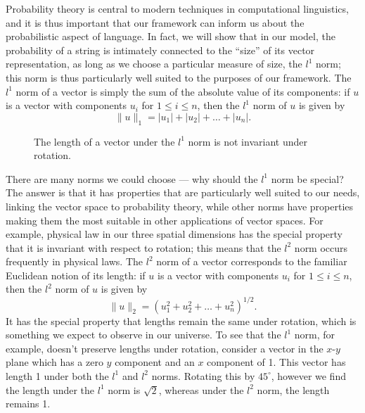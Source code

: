 Probability theory is central to modern techniques in computational linguistics, and it is thus important that our framework can inform us about the probabilistic aspect of language. In fact, we will show that in our model, the probability of a string is intimately connected to the ``size'' of its vector representation, as long as we choose a particular measure of size, the $l^1$ norm; this norm is thus particularly well suited to the purposes of our framework.
The $l^1$ norm of a vector is simply the sum of the absolute value of its components:  if $u$ is a vector with components $u_i$ for $1 \le i \le n$, then the $l^1$ norm of $u$ is given by
$$\|u\|_1 = |u_1| + |u_2| +\ldots + |u_n|.$$

\begin{figure}
\begin{center}
\subfigure{}
\subfigure{}
\caption{The length of a vector under the $l^1$ norm is not invariant under rotation.}
\end{center}
\end{figure}

 There are many norms we could choose --- why should the $l^1$ norm be special? The answer is that it has properties that are particularly well suited to our needs, linking the vector space to probability theory, while other norms have properties making them the most suitable in other applications of vector spaces.
For example, physical law in our three spatial dimensions has the special property that it is invariant with respect to rotation; this means that the $l^2$ norm occurs frequently in physical laws. The $l^2$ norm of a vector corresponds to the familiar Euclidean notion of its length: if $u$ is a vector with components $u_i$ for $1 \le i \le n$, then the $l^2$ norm of $u$ is given by
$$\|u\|_2 = (u_1^2 + u_2^2 +\ldots + u_n^2)^{1/2}.$$
It has the special property that lengths remain the same under rotation, which is something we expect to observe in our universe. 
To see that the $l^1$ norm, for example, doesn't preserve lengths under rotation, consider a vector in the $x$-$y$ plane which has a zero $y$ component and an $x$ component of 1. This vector has length 1 under both the $l^1$ and $l^2$ norms. Rotating this by $45^\circ$, however we find the length under the $l^1$ norm is $\sqrt{2}$, whereas under the $l^2$ norm, the length remains 1.

